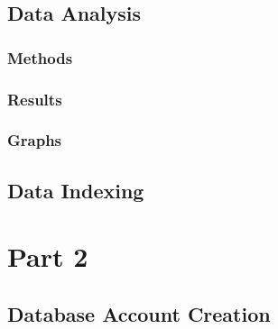 \documentclass[12pt]{scrbook}
\begin{document}
\subsection{Data Analysis}

\subsubsection{Methods}

\subsubsection{Results}

\subsubsection{Graphs}

\subsection{Data Indexing}

\section{Part 2}
\subsection{Database Account Creation}
\end{document}
